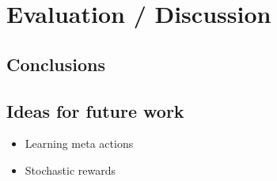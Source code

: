 \chapter{Evaluation / Discussion}
\label{chapter6}
\section{Conclusions}

\section{Ideas for future work}
\begin{itemize}
    \item Learning meta actions
    \item Stochastic rewards
\end{itemize}

